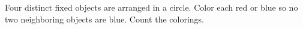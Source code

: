 Four distinct fixed objects are arranged in a circle. Color each red or blue so no two neighboring objects are blue. Count the colorings.
